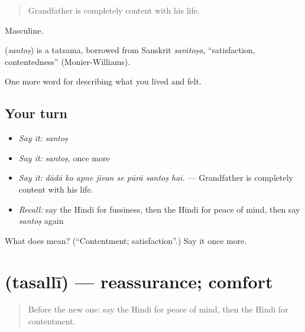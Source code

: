 \begin{quote}
Grandfather is completely content with his life.
\end{quote}

Masculine.

\begin{cousinweb}
\textbf{} (\emph{santoṣ}) is a tatsama, borrowed from Sanskrit \emph{saṁtoṣa}, \textquotedblleft{}satisfaction, contentedness\textquotedblright{} (Monier-Williams).
\end{cousinweb}

\begin{grammarlens}[title={What you've built}]
One more word for describing what you lived and felt.
\end{grammarlens}

\subsection*{Your turn}
\begin{itemize}
\raggedright
  \item \emph{Say it:} \emph{santoṣ}
  \item \emph{Say it:} \emph{santoṣ}, once more
  \item \emph{Say it:} \emph{dādā ko apne jīvan se pūrā santoṣ hai.} — Grandfather is completely content with his life.
  \item \emph{Recall:} say the Hindi for fussiness, then the Hindi for peace of mind, then say \emph{santoṣ} again
\end{itemize}

\begin{tcolorbox}[breakable,colback=teal!4,colframe=teal!35!black,title={Before you move on}]
What does  mean? (\textquotedblleft{}Contentment; satisfaction\textquotedblright{}.) Say it once more.
\end{tcolorbox}
\section[\texorpdfstring{\hi{तसल्ली} (tasallī)}{तसल्ली (tasallī)}]{ (tasallī) — reassurance; comfort}

\label{lesson:HI-C463-tasalli}



\begin{quote}
Before the new one: say the Hindi for peace of mind, then the Hindi for contentment.
\end{quote}

